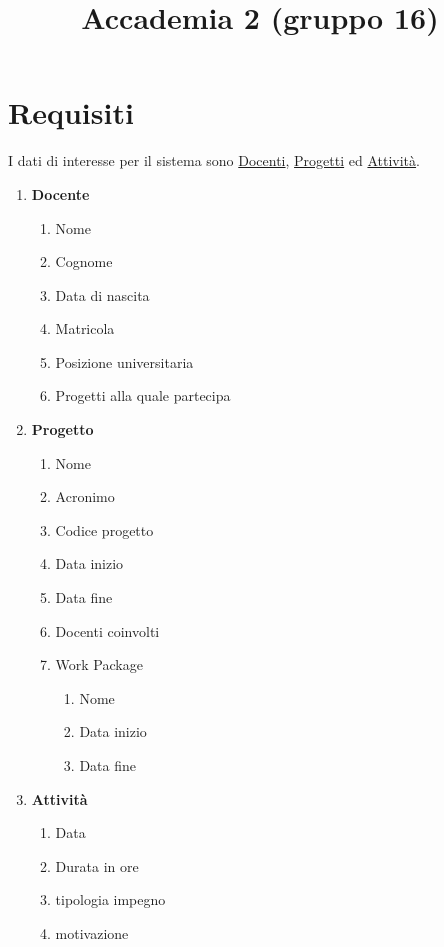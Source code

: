 \documentclass[12pt, letterpaper]{article}
\title{Accademia 2 (gruppo 16)}
\date{}
\begin{document}
\maketitle


\section{Requisiti}

I dati di interesse per il sistema sono \underline{Docenti}, \underline{Progetti} ed \underline{Attività}.
\begin{enumerate}
    \item \textbf{Docente}\begin{enumerate}
        \item Nome 
        \item Cognome 
        \item Data di nascita 
        \item Matricola 
        \item Posizione universitaria
        \item Progetti alla quale partecipa
    \end{enumerate}
    \item \textbf{Progetto}\begin{enumerate}
        \item Nome 
        \item Acronimo 
        \item Codice progetto
        \item Data inizio 
        \item Data fine 
        \item Docenti coinvolti
        \item Work Package\begin{enumerate}
            \item Nome 
            \item Data inizio 
            \item Data fine
        \end{enumerate}
    \end{enumerate}
    \item\textbf{Attività}\begin{enumerate}
        \item Data 
        \item Durata in ore 
        \item tipologia impegno 
        \item motivazione
    \end{enumerate}
\end{enumerate}\newpage
\end{document}
